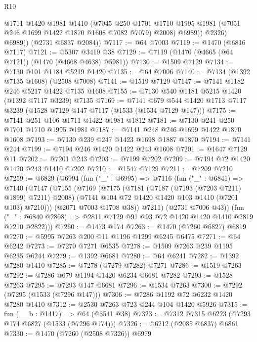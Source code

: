 \begin{lexlean}{R10}
\begin{coremodule}
                @1711
                @1420
                @1981
                @1410
                (@7045
                  @250
                  @1701
                  @1710
                  @1995
                  @1981
                  (@7051 @246 @1699 @1422 @1870 @1608 @7082 @7079)
                  @2008)
                @6989))
            @2326)
          @6989))
      (@2731 @6837 @2084))
@7117 := @64 @7003
@7119 := @1470 (@6816 @7117)
@7121 := @5307 @3419 @38
@7129 := @7119 (@1470 (@4665 (@64 @7121)) (@1470 (@4668 @4638) @5981))
@7130 := @1509 @7129
@7134 := @7130 @101 @1184 @5219 @1420
@7135 := @64 @7006
@7140 := @7134 (@1392 @7135 @1608) (@2508 @7008)
@7141 := @1519 @7129
@7147 := @7141 @1182 @246 @5217 @1422 @7135 @1608
@7155 := @7130 @540 @1181 @5215 @1420 (@1392 @7117 @3239) @7135
@7169 := @7141 @679 @544 @1420 @1713 @7117 @3239 (@1528 @7129 @147 @7117 (@1533 (@1534 @7129 @147)))
@7175 := @7141 @251 @106 @1711 @1422 @1981 @1812
@7181 := @7130 @241 @250 @1701 @1710 @1995 @1981
@7187 := @7141 @248 @246 @1699 @1422 @1870 @1608
@7193 := @7130 @239 @247 @1423 @1698 @1887 @1870
@7194 := @7141 @244
@7199 := @7194 @246 @1420 @1422 @243 @1608
@7201 := @1647 @7129 @11
@7202 := @7201 @243
@7203 := @7199 @7202
@7209 := @7194 @72 @1420 @1420 @243 @1410 @7202
@7210 := @1547 @7129
@7211 := @7209 @7210
@7259 := @6829
    (@6994
      (fun ("_" : @6995) =>
      @7116
        (fun ("_" : @6841) =>
        @7140
          (@7147
            (@7155
              (@7169
                (@7175
                  (@7181 (@7187 (@7193 (@7203 @7211) @1899) @7211) @2008)
                  (@7141 @104 @72 @1420 @1420 @103 @1410 (@7201 @103) @7210)))
              (@2071 @7003 @1708 @38))
            @7211)
          (@2731 @7006 @43))
        (fun ("_" : @6840 @2808) => @2811 @7129 @91 @93 @72 @1420 @1420 @1410 @2819 @7210 @2822)))
@7260 := @1473 @174
@7263 := @1470 (@7260 @6827) @6819
@7270 := @5995 @7263 @200 @11 @1196 @1299 @6245 @6475
@7271 := @64 @6242
@7273 := @7270 @7271 @6535
@7278 := @1509 @7263 @239 @1195 @6235 @6244
@7279 := @1392 @6681
@7280 := @64 @6241
@7282 := @1392 @7280 @1410
@7285 := @7278 (@7279 @7282) @7271
@7286 := @1519 @7263
@7292 := @7286 @679 @1194 @1420 @6234 @6681 @7282
@7293 := @1528 @7263
@7295 := @7293 @147 @6681
@7296 := @1534 @7263
@7300 := @7292 (@7295 (@1533 (@7296 @147)))
@7306 := @7286 @1192 @72 @6232 @1420 @7280 @1410
@7312 := @2530 @7263 @723 @244 @104 @1420 @5926
@7315 := fun (__b : @1417) => @64 (@3541 @38)
@7323 := @7312 @7315 @6223 (@7293 @174 @6827 (@1533 (@7296 @174)))
@7326 := @6212 (@2085 @6837) @6861
@7330 := @1470 (@7260 (@2508 @7326)) @6979

\end{coremodule}
\end{lexlean}
